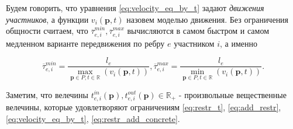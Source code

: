 \documentclass[12pt, a4paper]{article}
\begin{document}
Будем говорить, что уравнения \eqref{eq:velocity_eq_by_t} задают \textit{движения участников}, а функции $v_i(\textbf{p}, t)$ назовем моделью движения. Без ограничения общности считаем, что $\overline{\tau}_{e, i}^{min}, \overline{\tau}_{e, i}^{max}$ вычисляются в самом быстром и самом медленном варианте передвижения по ребру $e$ участником $i$, а именно

\begin{equation}
	\label{eq:restr_add_concrete}
	\overline{\tau}_{e, i}^{min} = \frac{l_e}{\max\limits_{\textbf{p} \in P, t \in \mathbb{R}} \left(  v_i(\textbf{p}, t) \right)}, \overline{\tau}_{e, i}^{max} = \frac{l_e}{\min\limits_{\textbf{p} \in P, t \in \mathbb{R}} \left(  v_i(\textbf{p}, t) \right)}.
\end{equation}

Заметим, что велечины $t_{e, i}^{in}(\textbf{p}), t_{e, i}^{out}(\textbf{p}) \in \mathbb{R}_+$ - произвольные вещественные велечины, которые удовлетворяют ограничениям \eqref{eq:restr_t}, \eqref{eq:add_restr}, \eqref{eq:velocity_eq_by_t}, \eqref{eq:restr_add_concrete}.
\end{document}
